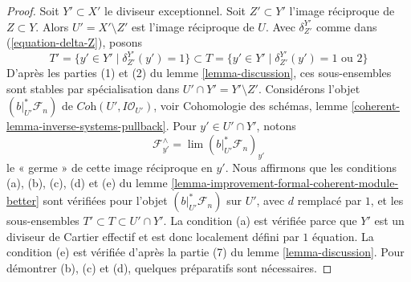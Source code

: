 \begin{proof}
Soit $Y' \subset X'$ le diviseur exceptionnel.
Soit $Z' \subset Y'$ l'image réciproque de $Z \subset Y$.
Alors $U' = X' \setminus Z'$ est l'image réciproque de $U$.
Avec $\delta^{Y'}_{Z'}$ comme dans (\ref{equation-delta-Z}), posons
$$
T' = \{y' \in Y' \mid \delta^{Y'}_{Z'}(y') = 1\}
\subset
T = \{y' \in Y' \mid \delta^{Y'}_{Z'}(y') = 1\text{ ou }2\}
$$
D'après les parties (1) et (2) du lemme \ref{lemma-discussion}, ces sous-ensembles sont
stables par spécialisation dans $U' \cap Y' = Y' \setminus Z'$. Considérons
l'objet $(b|_{U'}^*\mathcal{F}_n)$ de $\textit{Coh}(U', I\mathcal{O}_{U'})$,
voir Cohomologie des schémas, lemme \ref{coherent-lemma-inverse-systems-pullback}.
Pour $y' \in U' \cap Y'$, notons
$$
\mathcal{F}_{y'}^\wedge = \lim (b|_{U'}^*\mathcal{F}_n)_{y'}
$$
le « germe » de cette image réciproque en $y'$. Nous affirmons que les conditions
(a), (b), (c), (d) et (e) du
lemme \ref{lemma-improvement-formal-coherent-module-better}
sont vérifiées pour l'objet $(b|_{U'}^*\mathcal{F}_n)$ sur $U'$, avec $d$
remplacé par $1$, et les sous-ensembles $T' \subset T \subset U' \cap Y'$.
La condition (a) est vérifiée parce que $Y'$ est un diviseur de Cartier effectif
et est donc localement défini par $1$ équation. La condition (e) est vérifiée
d'après la partie (7) du lemme \ref{lemma-discussion}.
Pour démontrer (b), (c) et (d), quelques préparatifs sont nécessaires.


\end{proof}

